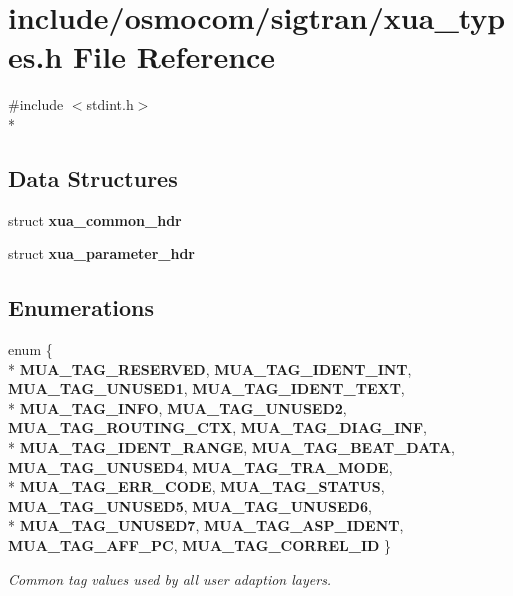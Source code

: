 \section{include/osmocom/sigtran/xua\+\_\+types.h File Reference}
\label{xua__types_8h}
{\ttfamily \#include $<$stdint.\+h$>$}\\*
\subsection*{Data Structures}
\begin{DoxyCompactItemize}
\item 
struct {\bf xua\+\_\+common\+\_\+hdr}
\item 
struct {\bf xua\+\_\+parameter\+\_\+hdr}
\end{DoxyCompactItemize}
\subsection*{Enumerations}
\begin{DoxyCompactItemize}
\item 
enum \{ \\*
{\bf M\+U\+A\+\_\+\+T\+A\+G\+\_\+\+R\+E\+S\+E\+R\+V\+ED}, 
{\bf M\+U\+A\+\_\+\+T\+A\+G\+\_\+\+I\+D\+E\+N\+T\+\_\+\+I\+NT}, 
{\bf M\+U\+A\+\_\+\+T\+A\+G\+\_\+\+U\+N\+U\+S\+E\+D1}, 
{\bf M\+U\+A\+\_\+\+T\+A\+G\+\_\+\+I\+D\+E\+N\+T\+\_\+\+T\+E\+XT}, 
\\*
{\bf M\+U\+A\+\_\+\+T\+A\+G\+\_\+\+I\+N\+FO}, 
{\bf M\+U\+A\+\_\+\+T\+A\+G\+\_\+\+U\+N\+U\+S\+E\+D2}, 
{\bf M\+U\+A\+\_\+\+T\+A\+G\+\_\+\+R\+O\+U\+T\+I\+N\+G\+\_\+\+C\+TX}, 
{\bf M\+U\+A\+\_\+\+T\+A\+G\+\_\+\+D\+I\+A\+G\+\_\+\+I\+NF}, 
\\*
{\bf M\+U\+A\+\_\+\+T\+A\+G\+\_\+\+I\+D\+E\+N\+T\+\_\+\+R\+A\+N\+GE}, 
{\bf M\+U\+A\+\_\+\+T\+A\+G\+\_\+\+B\+E\+A\+T\+\_\+\+D\+A\+TA}, 
{\bf M\+U\+A\+\_\+\+T\+A\+G\+\_\+\+U\+N\+U\+S\+E\+D4}, 
{\bf M\+U\+A\+\_\+\+T\+A\+G\+\_\+\+T\+R\+A\+\_\+\+M\+O\+DE}, 
\\*
{\bf M\+U\+A\+\_\+\+T\+A\+G\+\_\+\+E\+R\+R\+\_\+\+C\+O\+DE}, 
{\bf M\+U\+A\+\_\+\+T\+A\+G\+\_\+\+S\+T\+A\+T\+US}, 
{\bf M\+U\+A\+\_\+\+T\+A\+G\+\_\+\+U\+N\+U\+S\+E\+D5}, 
{\bf M\+U\+A\+\_\+\+T\+A\+G\+\_\+\+U\+N\+U\+S\+E\+D6}, 
\\*
{\bf M\+U\+A\+\_\+\+T\+A\+G\+\_\+\+U\+N\+U\+S\+E\+D7}, 
{\bf M\+U\+A\+\_\+\+T\+A\+G\+\_\+\+A\+S\+P\+\_\+\+I\+D\+E\+NT}, 
{\bf M\+U\+A\+\_\+\+T\+A\+G\+\_\+\+A\+F\+F\+\_\+\+PC}, 
{\bf M\+U\+A\+\_\+\+T\+A\+G\+\_\+\+C\+O\+R\+R\+E\+L\+\_\+\+ID}
 \}\begin{DoxyCompactList}\small\item\em Common tag values used by all user adaption layers. \end{DoxyCompactList}
\end{DoxyCompactItemize}

